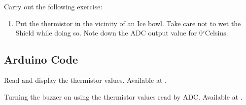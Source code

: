 \begin{exercise}
  Carry out the following exercise:
  \begin{enumerate}
    \item Put the thermistor in the vicinity of an Ice bowl. Take care not
          to wet the Shield while doing so. Note down the ADC output value for
          0$^{\circ}$Celsius.
  \end{enumerate}
\end{exercise}

\subsection{Arduino Code}
\label{sec:therm-arduino-code}

\begin{ardcode}
   {Read and display
    the thermistor values.  Available at
    .}
  \label{ard:therm-read}
  
\end{ardcode}

\begin{ardcode}
  {Turning the buzzer on using the thermistor values read by
    ADC.  Available at
    .}
  \label{ard:therm-buzzer}
  
\end{ardcode}

